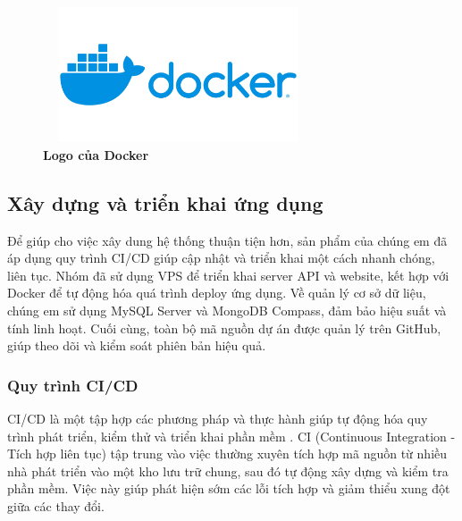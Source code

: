 \begin{figure}[H]
	\centering
	\includegraphics[width=8cm,height=4cm]{Images/Technology/docker.jpg}
	\caption[Logo của Docker]{\bfseries \fontsize{12pt}{0pt}
		\selectfont Logo của Docker}
	\label{docker} %
\end{figure}


\subsection{Xây dựng và triển khai ứng dụng}
Để giúp cho việc xây dung hệ thống thuận tiện hơn, sản phẩm của chúng em đã áp dụng quy trình CI/CD giúp cập nhật và triển khai một cách nhanh chóng, liên tục. Nhóm đã sử dụng VPS để triển khai server API và website, kết hợp với Docker để tự động hóa quá trình deploy ứng dụng. Về quản lý cơ sở dữ liệu, chúng em sử dụng MySQL Server và MongoDB Compass, đảm bảo hiệu suất và tính linh hoạt. Cuối cùng, toàn bộ mã nguồn dự án được quản lý trên GitHub, giúp theo dõi và kiểm soát phiên bản hiệu quả.
\subsubsection{Quy trình CI/CD}
CI/CD là một tập hợp các phương pháp và thực hành giúp tự động hóa quy trình phát triển, kiểm thử và triển khai phần mềm \cite{cicd}. CI (Continuous Integration - Tích hợp liên tục) tập trung vào việc thường xuyên tích hợp mã nguồn từ nhiều nhà phát triển vào một kho lưu trữ chung, sau đó tự động xây dựng và kiểm tra phần mềm. Việc này giúp phát hiện sớm các lỗi tích hợp và giảm thiểu xung đột giữa các thay đổi.


